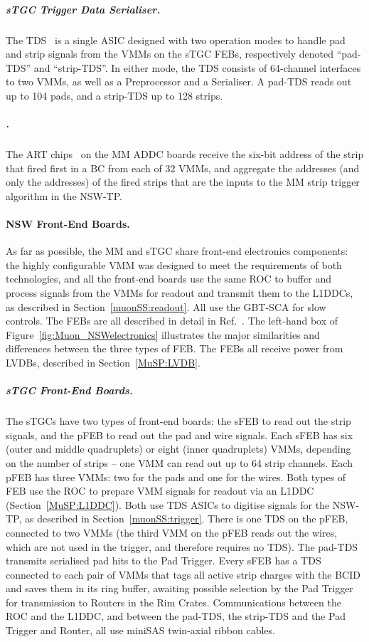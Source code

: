 \documentclass[cernpreprint, atlasdraft=false, UKenglish,british,orcidlogo, texmf, orcidlogo]{atlasdoc}
\begin{document}
\subparagraph{sTGC Trigger Data Serialiser.} 
The \gls{TDS}~\cite{TDSref} is a single \gls{ASIC} designed with two operation modes to handle pad and strip signals from the \glspl{VMM} on the \gls{sTGC} \glspl{FEB}, respectively denoted ``pad-\gls{TDS}'' and ``strip-\gls{TDS}''.
In either mode, the \gls{TDS} consists of 64-channel interfaces to two \glspl{VMM}, as well as a Preprocessor and a Serialiser.
A pad-\gls{TDS} reads out up to 104 pads, and a strip-\gls{TDS} up to 128 strips.
 
 
\subparagraph{. \label{MuSP:ART}}
The \gls{ART} chips~\cite{ARTref} on the \gls{MM} \gls{ADDC} boards receive the six-bit address of the strip that fired first in a \gls{BC} from each of \num{32} \glspl{VMM}, and aggregate the addresses (and only the addresses) of the fired strips that are the inputs to the \gls{MM} strip trigger algorithm in the \gls{NSW-TP}.
 
\paragraph{NSW Front-End Boards.}
As far as possible, the \gls{MM} and \gls{sTGC} share front-end electronics components: the highly configurable \gls{VMM} was designed to meet the requirements of both technologies, and all the front-end boards use the same \gls{ROC} to buffer and process signals from the \glspl{VMM} for readout and transmit them to the \glspl{L1DDC}, as described in Section~\ref{muonSS:readout}. All use the \gls{GBT-SCA} for slow controls. The \glspl{FEB} are all described in detail in Ref.~\cite{NSWelx}.
The left-hand box of Figure~\ref{fig:Muon_NSWelectronics} illustrates the major similarities and differences between the three types of \gls{FEB}.
The \glspl{FEB} all receive power from \glspl{LVDB}, described in Section~\ref{MuSP:LVDB}.
 
\subparagraph{sTGC Front-End Boards.}  
The \gls{sTGC}s have two types of front-end boards: the \gls{sFEB} to read out the strip signals, and the \gls{pFEB} to read out the pad and wire signals.
Each \gls{sFEB} has six (outer and middle quadruplets) or eight (inner quadruplets) \glspl{VMM}, depending on the number of strips -- one \gls{VMM} can read out up to \num{64} strip channels.
Each \gls{pFEB} has three \glspl{VMM}: two for the pads and one for the wires.
Both types of \gls{FEB} use the \gls{ROC} to prepare \gls{VMM} signals for readout via an \gls{L1DDC} (Section~\ref{MuSP:L1DDC}).
Both use \gls{TDS} \glspl{ASIC} to digitise signals for the \gls{NSW-TP}, as described in Section~\ref{muonSS:trigger}.
There is one \gls{TDS} on the \gls{pFEB}, connected to two \glspl{VMM} (the third \gls{VMM} on the \gls{pFEB} reads out the wires, which are not used in the trigger, and therefore requires no \gls{TDS}).
The pad-\gls{TDS} transmits serialised pad hits to the Pad Trigger.
Every \gls{sFEB} has a \gls{TDS} connected to each pair of \glspl{VMM} that tags all active strip charges with the \gls{BCID} and saves them in its ring buffer, awaiting possible selection by the Pad Trigger for transmission to Routers in the Rim Crates.
Communications between the \gls{ROC} and the \gls{L1DDC}, and between the pad-\gls{TDS}, the strip-\gls{TDS} and the Pad Trigger and Router, all use miniSAS twin-axial ribbon cables.
 
\end{document}
